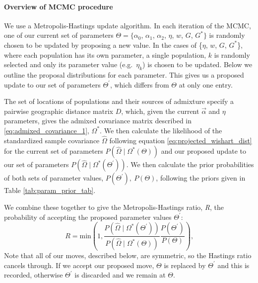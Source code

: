 \documentclass[12pt]{article}
\newcommand{\identifyadmixsource}[1]{{#1^{*}}}
\begin{document}
\paragraph{Overview of MCMC procedure}
We use a Metropolis-Hastings update algorithm. 
In each iteration of the MCMC, one of our current set of parameters 
$\Theta= \{\alpha_0$, $\alpha_1$, $\alpha_2$, $\eta$, $w$, $G$, $\identifyadmixsource{G}\}$ 
is randomly chosen to be updated by proposing a new value.  
In the cases of \{$\eta$, $w$, $G$, $\identifyadmixsource{G}$\}, where each population has its own parameter, a single population, $k$ 
is randomly selected and only its parameter value (e.g.\ $\eta_k$) is chosen to be updated. 
Below we outline the proposal distributions for each parameter. 
This gives us a proposed update to our set of parameters $\Theta^{\prime}$, which differs from $\Theta$ at only one entry.

The set of locations of populations and their sources of admixture specify a pairwise geographic distance matrix $D$, 
which, given the current $\vec{\alpha}$ and $\eta$ parameters, 
gives the admixed covariance matrix described in \eqref{eq:admixed_covariance_1}, $\identifyadmixsource{\Omega}$.  
We then calculate the likelihood of the standardized sample covariance $\widehat{\Omega}$ 
following equation \eqref{eq:projected_wishart_dist} for the current set of parameters 
$P(\widehat{\Omega} \mid \identifyadmixsource{\Omega}(\Theta))$ and our proposed update to our set of parameters 
$P(\widehat{\Omega} \mid \identifyadmixsource{\Omega}(\Theta^{\prime}))$. 
We then calculate the prior probabilities of both sets of parameter values, $P(\Theta^{\prime}),~P(\Theta) $, 
following the priors given in Table \ref{tab:param_prior_tab}.

We combine these together to give the Metropolis-Hastings ratio, \emph{R}, the probability of accepting the proposed parameter values $\Theta^{\prime}$:
\begin{equation}
R = \text{min}\left(1, \frac{P(\widehat{\Omega} \mid \identifyadmixsource{\Omega}(\Theta^{\prime}))} {P(\widehat{\Omega} \mid \identifyadmixsource{\Omega}(\Theta))} 
				\frac{P(\Theta^{\prime})}{P(\Theta)} 	\right) \text{,}
\label{eq:MH_algorithm}
\end{equation}
Note that all of our moves, described below, are symmetric, so the Hastings ratio cancels through. If we accept our proposed move, $\Theta$ is replaced by $\Theta^{\prime}$ and this is recorded, otherwise $\Theta^{\prime}$ is discarded and we remain at $\Theta$. 
\end{document}

